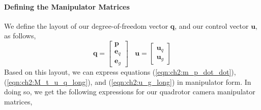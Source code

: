 \paragraph{Defining the Manipulator Matrices}
We define the layout of our degree-of-freedom vector $\mathbf{q}$, and our control vector $\mathbf{u}$, as follows,
%
\begin{equation}
\mathbf{q} = 
\begin{bmatrix}
\mathbf{p} \\
\mathbf{e}_q \\
\mathbf{e}_g
\end{bmatrix}
%
~~~~
\mathbf{u} = 
\begin{bmatrix}
\mathbf{u}_q \\
\mathbf{u}_g
\end{bmatrix}
\end{equation}
%
Based on this layout, we can express equations (\ref{eqn:ch2:m_p_dot_dot}), (\ref{eqn:ch2:M_t_u_q_long}), and (\ref{eqn:ch2:u_g_long}) in manipulator form.
In doing so, we get the following expressions for our quadrotor camera manipulator matrices,
%
